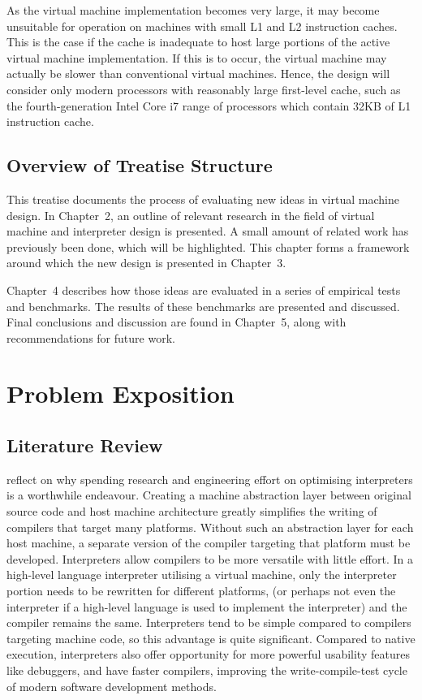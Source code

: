 		As the virtual machine implementation becomes very large, it may become unsuitable for operation on machines with small L1 and L2 instruction caches. This is the case if the cache is inadequate to host large portions of the active virtual machine implementation. If this is to occur, the virtual machine may actually be slower than conventional virtual machines. Hence, the design will consider only modern processors with reasonably large first-level cache, such as the fourth-generation Intel Core i7 range of processors which contain 32KB of L1 instruction cache.
				
	\section{Overview of Treatise Structure}
		This treatise documents the process of evaluating new ideas in virtual machine design. In Chapter~2, an outline of relevant research in the field of virtual machine and interpreter design is presented. A small amount of related work has previously been done, which will be highlighted. This chapter forms a framework around which the new design is presented in Chapter~3.
		
		Chapter~4 describes how those ideas are evaluated in a series of empirical tests and benchmarks. The results of these benchmarks are presented and discussed. Final conclusions and discussion are found in Chapter~5, along with recommendations for future work.

\chapter{Problem Exposition}
	\section{Literature Review}
		\cite{structureinterpreters} reflect on why spending research and engineering effort on optimising interpreters is a worthwhile endeavour. Creating a machine abstraction layer between original source code and host machine architecture greatly simplifies the writing of compilers that target many platforms. Without such an abstraction layer for each host machine, a separate version of the compiler targeting that platform must be developed. Interpreters allow compilers to be more versatile with little effort. In a high-level language interpreter utilising a virtual machine, only the interpreter portion needs to be rewritten for different platforms, (or perhaps not even the interpreter if a high-level language is used to implement the interpreter) and the compiler remains the same. Interpreters tend to be simple compared to compilers targeting machine code, so this advantage is quite significant. Compared to native execution, interpreters also offer opportunity for more powerful usability features like debuggers, and have faster compilers, improving the write-compile-test cycle of modern software development methods.
		
